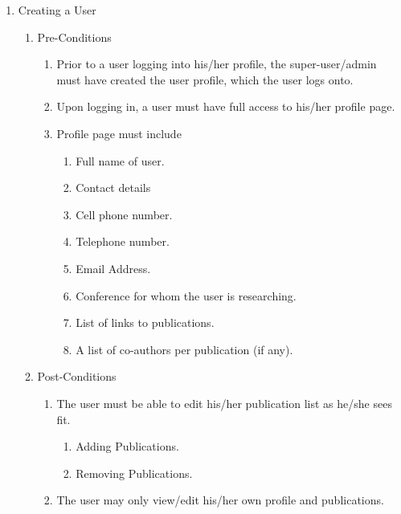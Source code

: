 \documentclass[hidelinks,a4paper,12pt]{article}
\begin{document}
	\begin{enumerate}
		\item  Creating a User
		
		\begin{enumerate}
			\item  Pre-Conditions
			
			\begin{enumerate}
				\item  Prior to a user logging into his/her profile, the super-user/admin must have created the user profile, which the user logs onto.
				
				\item  Upon logging in, a user must have full access to his/her profile page.
				
				\item  Profile page must include
				
				\begin{enumerate}
					\item  Full name of user.
					
					\item  Contact details
					
					\item  Cell phone number.
					
					\item  Telephone number.
					
					\item  Email Address.
					
					\item  Conference for whom the user is researching.
					
					\item  List of links to publications.
					
					\item  A list of co-authors per publication (if any).
				\end{enumerate}
			\end{enumerate}
			
			\item  Post-Conditions
			
			\begin{enumerate}
				\item  The user must be able to edit his/her publication list as he/she sees fit.
				
				\begin{enumerate}
					\item  Adding Publications.
					
					\item  Removing Publications.
				\end{enumerate}
				
				\item  The user may only view/edit his/her own profile and publications.
			\end{enumerate}
		\end{enumerate}
	\end{enumerate}
	
\end{document}
